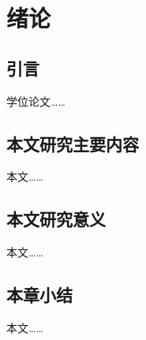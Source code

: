 
\chapter{绪论}

\section{引言}
学位论文……

\section{本文研究主要内容}
本文……

\section{本文研究意义}
本文……

\section{本章小结}
本文……

